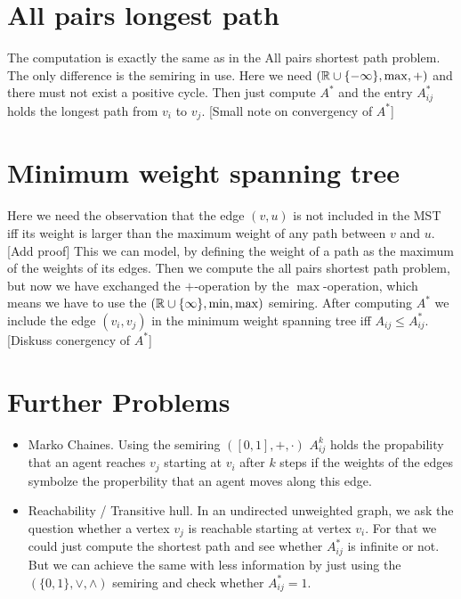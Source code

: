 \section{All pairs longest path}
The computation is exactly the same as in the All pairs shortest path problem. The only difference is the semiring in use. Here we need $(\mathbb{R} \cup \{-\infty\}, \max, +)$ and there must not exist a positive cycle. Then just compute $A^*$ and the entry $A^*_{ij}$ holds the longest path from $v_i$ to $v_j$. [Small note on convergency of $A^*$]

\section{Minimum weight spanning tree}
Here we need the observation that the edge $(v, u)$ is not included in the MST iff its weight is larger than the maximum weight of any path between $v$ and $u$. [Add proof] This we can model, by defining the weight of a path as the maximum of the weights of its edges. Then we compute the all pairs shortest path problem, but now we have exchanged the $+$-operation by the $\max$-operation, which means we have to use the $(\mathbb{R} \cup\{\infty\}, \min, \max)$ semiring. After computing $A^*$ we include the edge $(v_i, v_j)$ in the minimum weight spanning tree iff $A_{ij} \leq A^*_{ij}$.
[Diskuss conergency of $A^*$]

\section{Further Problems}
\begin{itemize}
    \item Marko Chaines. Using the semiring $([0, 1], +, \cdot)$ $A^k_{ij}$ holds the propability that an agent reaches $v_j$ starting at $v_i$ after $k$ steps if the weights of the edges symbolze the properbility that an agent moves along this edge.
    \item Reachability / Transitive hull. In an undirected unweighted graph, we ask the question whether a vertex $v_j$ is reachable starting at vertex $v_i$. For that we could just compute the shortest path and see whether $A^*_{ij}$ is infinite or not. But we can achieve the same with less information by just using the $(\{0, 1\}, \lor, \land)$ semiring and check whether $A^*_{ij} = 1$.
\end{itemize}